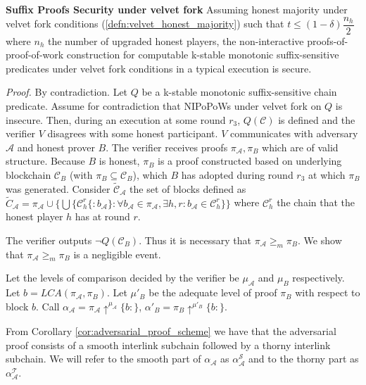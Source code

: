 \begin{thm}{\textbf{Suffix Proofs Security under velvet fork}}
	Assuming honest majority under velvet fork conditions (\ref{defn:velvet_honest_majority}) such that $t \leq (1 - \delta) \dfrac{n_h}{2}$ where $n_h$ the number of upgraded honest players, the non-interactive proofs-of-proof-of-work construction for computable k-stable monotonic suffix-sensitive predicates under velvet fork conditions in a typical execution is secure.
\end{thm}
\textit{Proof.} By contradiction. Let $Q$ be a k-stable monotonic suffix-sensitive chain
predicate. Assume for contradiction that NIPoPoWs under velvet fork on $Q$ is insecure. Then, during an execution at some round  $r_3$, $Q(\mathcal{C})$ is defined and the verifier $V$ disagrees with some honest participant. $V$ communicates with adversary $\mathcal{A}$ and honest prover $B$. The verifier receives proofs $\pi_\mathcal{A}, \pi_B$ which are of valid structure. Because $B$ is honest, $\pi_B$ is a proof constructed
based on underlying blockchain $\mathcal{C}_B$ (with $\pi_B \subseteq \mathcal{C}_B$), which $B$
has adopted during round $r_3$ at which $\pi_B$ was generated. Consider
$\widetilde{\mathcal{C}}_\mathcal{A}$ the set of blocks defined as
$\widetilde{C}_\mathcal{A} = \pi_\mathcal{A} \cup \{ \bigcup \{\mathcal{C}_h^r\{:b_\mathcal{A}\}:  \forall b_\mathcal{A} \in \pi_\mathcal{A}, \exists h,r : b_\mathcal{A} \in 
\mathcal{C}_{h}^{r}\}  \}$ where $\mathcal{C}_h^r$ the chain 
 that the honest player $h$ has at round $r$.

The verifier outputs $\neg Q(\mathcal{C}_B)$. Thus it is necessary that $\pi_\mathcal{A} {\geq}_m \pi_B$.
We show that $\pi_\mathcal{A} {\geq}_m \pi_B$ is a negligible event.

Let the levels of comparison decided by the verifier
be $\mu_\mathcal{A}$ and $\mu_B$ respectively. Let $b = LCA(\pi_\mathcal{A}, \pi_B)$. Let $\mu'_B$ be the adequate level of proof
$\pi_B$  with respect to block $b$. Call $\alpha_\mathcal{A} = \pi_\mathcal{A} \uparrow^{\mu_\mathcal{A}}\{b:\}$,
$\alpha'_B = \pi_B \uparrow^{\mu'_B}\{b:\}$.

From Corollary \ref{cor:adversarial_proof_scheme} we have that the adversarial proof 
consists of a smooth interlink subchain followed by a thorny interlink subchain. We will refer to the smooth part of $\alpha_\mathcal{A}$ as $\alpha^{\mathcal{S}}_\mathcal{A}$ and to the thorny part as $\alpha^{\mathcal{T}}_\mathcal{A}$.   

